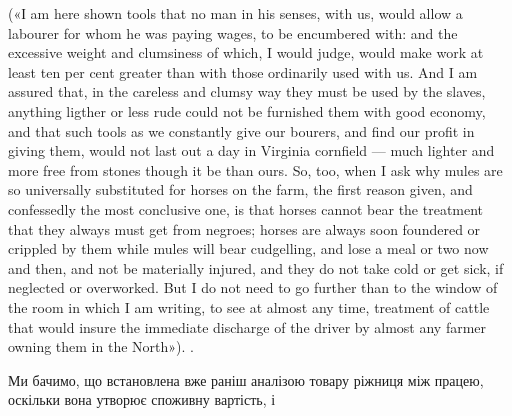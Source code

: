 {(«І am here shown tools that no man in his senses, with us, would
allow a labourer for whom he was paying wages, to be encumbered with:
and the excessive weight and clumsiness of which, I would judge, would
make work at least ten per cent greater than with those ordinarily used
with us. And I am assured that, in the careless and clumsy way they must
be used by the slaves, anything ligther or less rude could not be furnished
them with good economy, and that such tools as we constantly give our
bourers, and find our profit in giving them, would not last out a day in
Virginia cornfield — much lighter and more free from stones though it be
than ours. So, too, when I ask why mules are so universally substituted for
horses on the farm, the first reason given, and confessedly the most conclusive
one, is that horses cannot bear the treatment that they always must get
from negroes; horses are always soon foundered or crippled by them while
mules will bear cudgelling, and lose a meal or two now and then, and not
be materially injured, and they do not take cold or get sick, if neglected
or overworked. But I do not need to go further than to the window of the room
in which I am writing, to see at almost any time, treatment of cattle
that would insure the immediate discharge of the driver by almost any farmer
owning them in the North»).
}.

Ми бачимо, що встановлена вже раніш аналізою товару ріжниця
між працею, оскільки вона утворює споживну вартість, і
\parbreak{}  %

